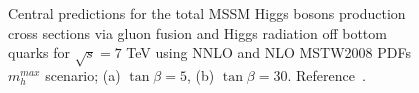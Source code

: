 \begin{figure}[tp]
     \begin{center}

    \end{center}
    \caption{Central predictions for the total MSSM Higgs bosons production cross sections via gluon fusion and Higgs radiation off
	bottom quarks  for $\sqrt{s} = 7$ TeV using NNLO and NLO MSTW2008 PDFs $m_h^{max}$ scenario; (a) $\tan\beta  = 5$, (b) $\tan\beta  = 30$.
	Reference~\cite{LHCxsec1}. }

   \label{fig:xsec}
\end{figure}


